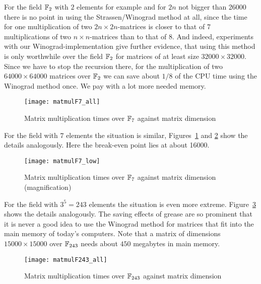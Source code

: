 For the field $\mathbb{F}_2$ with $2$ elements for example and for $2n$ not bigger than
26000 there is no point in using the Strassen/Winograd method at all, 
since the time for one multiplication of two $2n \times 2n$-matrices
is closer to that of 7 multiplications of two $n \times n$-matrices than to
that of 8. And indeed, experiments with our Winograd-implementation give
further evidence, that using this method is only worthwhile over the field
$\mathbb{F}_2$ for matrices of at least size $32000 \times 32000$.
Since we have to stop the recursion there, for the multiplication of
two $64000 \times 64000$ matrices over $\mathbb{F}_2$ we can save about $1/8$ of
the CPU time using the Winograd method once. We pay with a lot more needed
memory.

\begin{figure}[ht]
\begin{center}
\texttt{[image: matmulF7\_all]}
\end{center}
\caption{Matrix multiplication times over $\mathbb{F}_7$ against matrix dimension}
\label{matmulf7}
\end{figure}

For the field with $7$ elements the situation is similar,
Figures~\ref{matmulf7} and \ref{matmulf7scaled} show the details
analogously. Here the break-even point lies at about 16000.

\begin{figure}[ht]
\begin{center}
\texttt{[image: matmulF7\_low]}
\end{center}
\caption{Matrix multiplication times over $\mathbb{F}_7$ against matrix dimension
(magnification)}
\label{matmulf7scaled}
\end{figure}

For the field with $3^5 = 243$ elements the situation is even more extreme.
Figure~\ref{matmulF243} shows the details analogously. The saving effects
of grease are so prominent that it is never a good idea to use the Winograd 
method for matrices that fit into the main memory of today's computers.
Note that a matrix of dimensions $15000 \times 15000$ over $\mathbb{F}_{243}$
needs about $450$ megabytes in main memory.

\begin{figure}[ht]
\begin{center}
\texttt{[image: matmulF243\_all]}
\end{center}
\caption{Matrix multiplication times over $\mathbb{F}_{243}$ against matrix dimension}
\label{matmulF243}
\end{figure}

